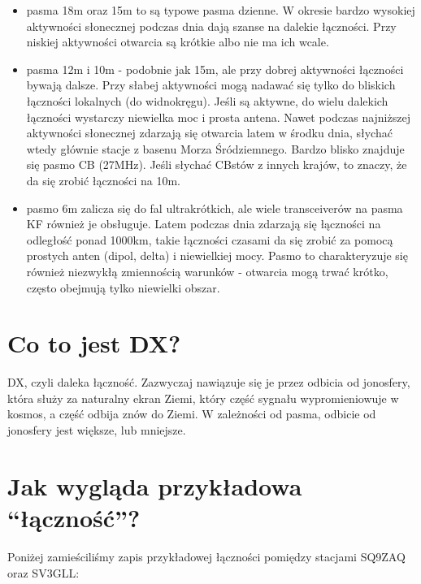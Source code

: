 \documentclass[a4paper,12pt]{article}
\begin{document}
\begin{itemize}
 \item pasma 18m oraz 15m to są typowe pasma dzienne. W okresie bardzo wysokiej aktywności słonecznej podczas dnia dają szanse na dalekie łączności. Przy niskiej aktywności otwarcia są krótkie albo nie ma ich wcale.
 \item pasma 12m i 10m - podobnie jak 15m, ale przy dobrej aktywności łączności bywają dalsze. Przy słabej aktywności mogą nadawać się tylko do bliskich łączności lokalnych (do widnokręgu). Jeśli są aktywne, do wielu dalekich łączności wystarczy niewielka moc i prosta antena. Nawet podczas najniższej aktywności słonecznej zdarzają się otwarcia latem w środku dnia, słychać wtedy głównie stacje z basenu Morza Śródziemnego. Bardzo blisko znajduje się pasmo CB (27MHz). Jeśli słychać CBstów z innych krajów, to znaczy, że da się zrobić łączności na 10m.
 \item pasmo 6m zalicza się do fal ultrakrótkich, ale wiele transceiverów na pasma KF również je obsługuje. Latem podczas dnia zdarzają się łączności na odległość ponad 1000km, takie łączności czasami da się zrobić za pomocą prostych anten (dipol, delta) i niewielkiej mocy. Pasmo to charakteryzuje się również niezwykłą zmiennością warunków - otwarcia mogą trwać krótko, często obejmują tylko niewielki obszar.
\end{itemize}


\section{Co to jest DX?}
DX, czyli daleka łączność. Zazwyczaj nawiązuje się je przez odbicia od jonosfery, która służy za naturalny ekran Ziemi, który część sygnału wypromieniowuje w kosmos, a część odbija znów do Ziemi. W zależności od pasma, odbicie od jonosfery jest większe, lub mniejsze.

\section{Jak wygląda przykładowa ``łączność''?}
Poniżej zamieściliśmy zapis przykładowej łączności pomiędzy stacjami SQ9ZAQ oraz SV3GLL:
\end{document}
